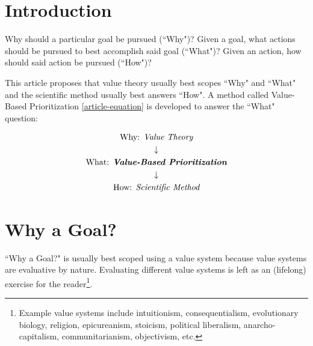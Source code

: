 \documentclass[12pt, a4paper, twocolumn]{article}
\begin{document}

\twocolumn[
  \begin{@twocolumnfalse}
    \maketitle
    \begin{abstract}
      \abstractText
      \newline
      \newline
    \end{abstract}
  \end{@twocolumnfalse}
]


\section{Introduction}

Why should a particular goal be pursued (``Why")? Given a goal, what actions should be pursued to best accomplish said goal (``What")? Given an action, how should said action be pursued (``How")?

This article proposes that value theory usually best scopes ``Why" and ``What" and the scientific method usually best answers ``How". A method called Value-Based Prioritization \eqref{article-equation} is developed to answer the ``What" question:

\begin{equation}\label{article-equation}
  \begin{gathered}
    \textrm{Why: } \textit{Value Theory} \\
    \downarrow \\
    \textrm{What: } \textit{\textbf{Value-Based Prioritization}} \\
    \downarrow \\
    \textrm{How: } \textit{Scientific Method}
  \end{gathered}
\end{equation}

\section{Why a Goal?}

``Why a Goal?" is usually best scoped using a value system because value systems are evaluative by nature\cite{value-theory}. Evaluating different value systems is left as an (lifelong) exercise for the reader\footnote{Example value systems include intuitionism\cite{huemer2007ethical}, consequentialism\cite{consequentialism}, evolutionary biology\cite{morality-biology}, religion\cite{religion-morality}, epicureanism\cite{epicurus}, stoicism\cite{stoicism}, political liberalism\cite{rawls}, anarcho-capitalism\cite{huemer2013problem}, communitarianism\cite{communitarianism}, objectivism\cite{ayn-rand}, etc.}.
\end{document}
